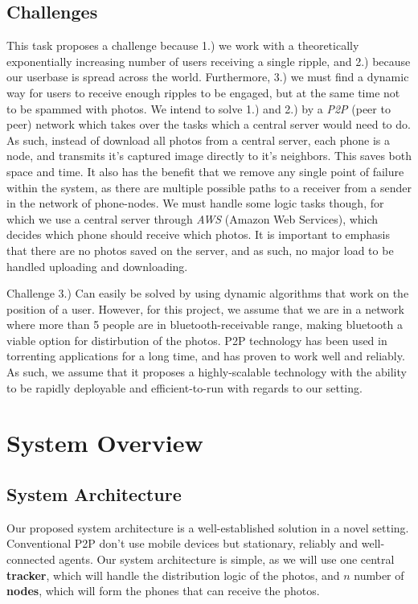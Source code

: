 \documentclass{report}
\begin{document}
\subsection{Challenges}
This task proposes a challenge because 1.) we work with a theoretically exponentially increasing number of users receiving a single ripple, and 2.) because our userbase is spread across the world. Furthermore, 3.) we must find a dynamic way for users to receive enough ripples to be engaged, but at the same time not to be spammed with photos.
\newline
We intend to solve 1.) and 2.) by a \textit{P2P} (peer to peer) network which takes over the tasks which a central server would need to do. As such, instead of download all photos from a central server, each phone is a node, and transmits it's captured image directly to it's neighbors. This saves both space and time. It also has the benefit that we remove any single point of failure within the system, as there are multiple possible paths to a receiver from a sender in the network of phone-nodes. We must handle some logic tasks though, for which we use a central server through \textit{AWS} (Amazon Web Services), which decides which phone should receive which photos. It is important to emphasis that there are no photos saved on the server, and as such, no major load to be handled uploading and downloading.

 Challenge 3.) Can easily be solved by using dynamic algorithms that work on the position of a user. However, for this project, we assume that we are in a network where more than 5 people are in bluetooth-receivable range, making bluetooth a viable option for distirbution of the photos.
\newline
P2P technology has been used in torrenting applications for a long time, and has proven to work well and reliably. As such, we assume that it proposes a highly-scalable technology with the ability to be rapidly deployable and efficient-to-run with regards to our setting.


\section{System Overview}


\subsection{System Architecture}
Our proposed system architecture is a well-established solution in a novel setting. Conventional P2P don't use mobile devices but stationary, reliably and well-connected agents. Our system architecture is simple, as we will use one central \textbf{tracker}, which will handle the distribution logic of the photos, and $ n $ number of \textbf{nodes}, which will form the phones that can receive the photos.
\end{document}
